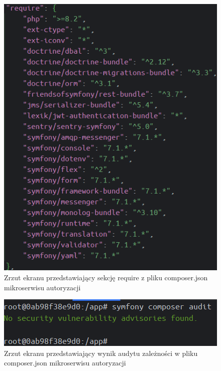 \documentclass[12pt,oneside]{book}
\newcommand{\captionvspace}{\vspace{6pt}}
\begin{document}
    \begin{figure}[ht]
        \centering
        \includegraphics[width=\textwidth]{includes/images/composer-require-section.png}
        \captionvspace
        \caption{Zrzut ekranu przedstawiający sekcję require z pliku composer.json mikroserwisu autoryzacji}
        \label{fig:composer-require}
    \end{figure}

    \begin{figure}[ht]
        \centering
        \includegraphics[width=\textwidth]{includes/images/composer-audit.png}
        \captionvspace
        \caption{Zrzut ekranu przedstawiający wynik audytu zależności w pliku composer.json mikroserwisu autoryzacji}
        \label{fig:composer-audit}
    \end{figure}
\end{document}
